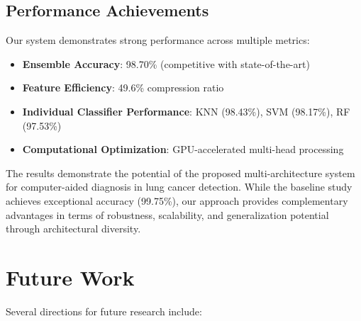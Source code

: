 \documentclass[journal]{IEEEtran}
\begin{document}
\subsection{Performance Achievements}

Our system demonstrates strong performance across multiple metrics:
\begin{itemize}
    \item \textbf{Ensemble Accuracy}: 98.70\% (competitive with state-of-the-art)
    \item \textbf{Feature Efficiency}: 49.6\% compression ratio
    \item \textbf{Individual Classifier Performance}: KNN (98.43\%), SVM (98.17\%), RF (97.53\%)
    \item \textbf{Computational Optimization}: GPU-accelerated multi-head processing
\end{itemize}

The results demonstrate the potential of the proposed multi-architecture system for computer-aided diagnosis in lung cancer detection. While the baseline study achieves exceptional accuracy (99.75\%), our approach provides complementary advantages in terms of robustness, scalability, and generalization potential through architectural diversity.

\section{Future Work}

Several directions for future research include:
\end{document}
